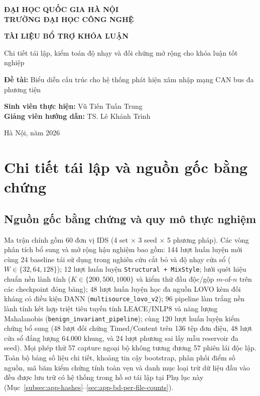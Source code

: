 \documentclass[12pt, a4paper, reqno, oneside]{book}
\DeclareRobustCommand{\code}[1]{\nolinkurl{#1}}
\begin{document}

\frontmatter
\begin{titlepage}
\centering
\vspace*{2cm}
{\bfseries\LARGE ĐẠI HỌC QUỐC GIA HÀ NỘI\\ TRƯỜNG ĐẠI HỌC CÔNG NGHỆ\par}
\vspace*{2.5cm}
{\bfseries\huge TÀI LIỆU BỔ TRỢ KHÓA LUẬN\par}
\vspace*{0.8cm}
{\Large Chi tiết tái lập, kiểm toán độ nhạy và đối chứng mở rộng cho khóa luận tốt nghiệp\par}
\vspace*{1.5cm}
{\large \textbf{Đề tài:} Biểu diễn cấu trúc cho hệ thống phát hiện xâm nhập mạng CAN bus đa phương tiện\par}
\vspace*{2cm}
{\large \textbf{Sinh viên thực hiện:} Vũ Tiến Tuấn Trung\\
\textbf{Giảng viên hướng dẫn:} TS. Lê Khánh Trình\par}
\vfill
{\large Hà Nội, năm 2026\par}
\end{titlepage}

\tableofcontents
\listoftables
\clearpage

\mainmatter
\appendix
\chapter{Chi tiết tái lập và nguồn gốc bằng chứng}\label{app:reproducibility}
\section{Nguồn gốc bằng chứng và quy mô thực nghiệm}\label{sec:app-provenance}
Ma trận chính gồm 60 đơn vị IDS (4 set $\times$ 3 seed $\times$ 5 phương pháp). Các vòng phân tích bổ sung và mở rộng hậu nghiệm bao gồm: 144 lượt huấn luyện mới cùng 24 baseline tái sử dụng trong nghiên cứu cắt bỏ và độ nhạy cửa sổ ($W \in \{32, 64, 128\}$); 12 lượt huấn luyện \code{Structural + MixStyle}; lưới quét hiệu chuẩn nền lành tính ($K \in \{200, 500, 1000\}$ và kiểm thử đầu độc/gộp $m$-of-$n$ trên các checkpoint đóng băng); 48 lượt huấn luyện học đa nguồn LOVO kèm đối kháng có điều kiện DANN (\code{multisource\_lovo\_v2}); 96 pipeline làm trắng nền lành tính kết hợp triệt tiêu tuyến tính LEACE/INLP8 và năng lượng Mahalanobis (\code{benign\_invariant\_pipeline}); cùng 120 lượt huấn luyện kiểm chứng bổ sung (48 lượt đối chứng Timed/Content trên 136 tệp đơn điệu, 48 lượt cửa sổ đẳng lượng $64.000$ khung, và 24 lượt phương sai lấy mẫu reservoir đa seed). Mọi phép thử 57 capture ngoại bộ không tương đương 57 phiên lái độc lập. Toàn bộ bảng số liệu chi tiết, khoảng tin cậy bootstrap, phân phối điểm số nguồn, mã băm kiểm chứng tính toàn vẹn và danh mục loại trừ dữ liệu đầu vào đều được lưu trữ có hệ thống trong hồ sơ tái lập tại Phụ lục này (Mục~\ref{subsec:app-hashes}--\ref{sec:app-bd-per-file-counts}).
\end{document}
